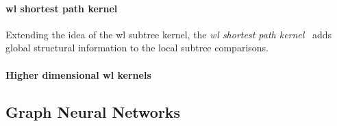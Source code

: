 \paragraph{\ac{wl} shortest path kernel}
Extending the idea of the \ac{wl} subtree kernel, the \textit{\ac{wl} shortest path kernel}~\cite{Shervashidze2011} adds global structural information to the local subtree comparisons.

\paragraph{Higher dimensional \ac{wl} kernels}

\subsection{Graph Neural Networks}%
\label{sec:related:gcr:nn}
